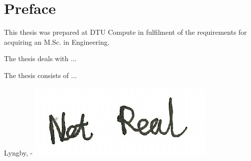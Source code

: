 \chapter{Preface}

This thesis was prepared at DTU Compute in fulfilment of the requirements for acquiring an M.Sc. in Engineering.

The thesis deals with ...

The thesis consists of ...
\vspace{20mm}
\begin{center}
    \hspace{20mm} Lyngby, \thesishandin-\thesisyear
    \vspace{5mm}
    \newline
    \includegraphics[scale=0.5]{figures/SignatureDummy}
\end{center}
\begin{flushright}
    \thesisauthor
\end{flushright}
